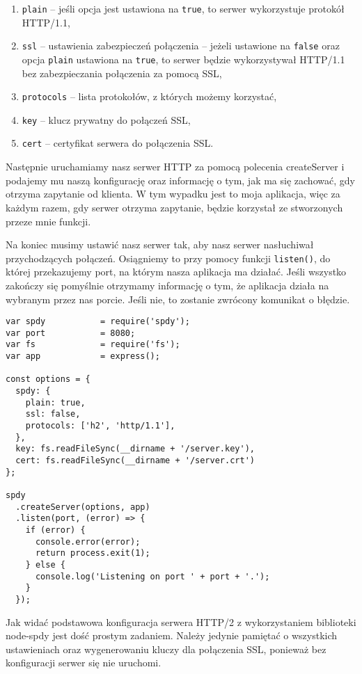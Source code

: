 \documentclass[a4paper,12pt,twoside,openany]{report}
\begin{document}
\begin{enumerate}
	\item \texttt{plain} -- jeśli opcja jest ustawiona na \texttt{true}, to serwer wykorzystuje protokół HTTP/1.1, 
	\item \texttt{ssl} -- ustawienia zabezpieczeń połączenia -- jeżeli ustawione na \texttt{false} oraz opcja \texttt{plain} ustawiona na \texttt{true}, to serwer będzie wykorzystywał HTTP/1.1 bez zabezpieczania połączenia za pomocą SSL,
	\item \texttt{protocols} -- lista protokołów, z których możemy korzystać,
	\item \texttt{key} -- klucz prywatny do połączeń SSL,
	\item \texttt{cert} -- certyfikat serwera do połączenia SSL.
\end{enumerate}

Następnie uruchamiamy nasz serwer HTTP za pomocą polecenia createServer i podajemy mu naszą konfigurację oraz informację o tym, jak ma się zachować, gdy otrzyma zapytanie od klienta.
W tym wypadku jest to moja aplikacja, więc za każdym razem, gdy serwer otrzyma zapytanie, będzie korzystał ze stworzonych przeze mnie funkcji.

Na koniec musimy ustawić nasz serwer tak, aby nasz serwer nasłuchiwał przychodzących połączeń.
Osiągniemy to przy pomocy funkcji \texttt{listen()}, do której przekazujemy port, na którym nasza aplikacja ma działać.
Jeśli wszystko zakończy się pomyślnie otrzymamy informację o tym, że aplikacja działa na wybranym przez nas porcie.
Jeśli nie, to zostanie zwrócony komunikat o błędzie.

\begin{lstlisting}[caption=Konfiguracja serwera, label=server]
var spdy           = require('spdy');
var port           = 8080;
var fs             = require('fs');
var app            = express();
	
const options = {
  spdy: {
    plain: true,
    ssl: false,
    protocols: ['h2', 'http/1.1'],
  },
  key: fs.readFileSync(__dirname + '/server.key'),
  cert: fs.readFileSync(__dirname + '/server.crt')
};

spdy
  .createServer(options, app)
  .listen(port, (error) => {
    if (error) {
      console.error(error);
      return process.exit(1);
    } else {
      console.log('Listening on port ' + port + '.');
    }
  });
\end{lstlisting}

Jak widać podstawowa konfiguracja serwera HTTP/2 z wykorzystaniem biblioteki node-spdy \cite{spdy} jest dość prostym zadaniem.
Należy jedynie pamiętać o wszystkich ustawieniach oraz wygenerowaniu kluczy dla połączenia SSL, ponieważ bez konfiguracji serwer się nie uruchomi.
\end{document}

